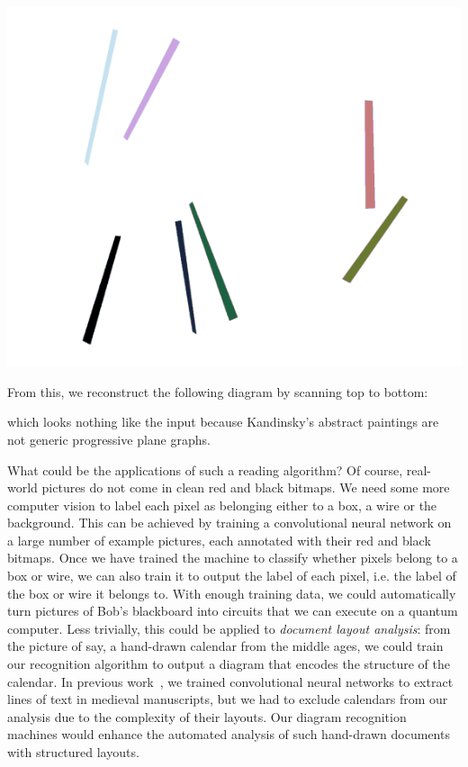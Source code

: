 \begin{example}
\begin{center}
\hspace{10pt}
\includegraphics[scale=.2]{img/punkt-und-linie/wires.png}
\end{center}

From this, we reconstruct the following diagram by scanning top to bottom:


which looks nothing like the input because Kandinsky's abstract paintings are not generic progressive plane graphs.
\end{example}

What could be the applications of such a reading algorithm?
Of course, real-world pictures do not come in clean red and black bitmaps.
We need some more computer vision to label each pixel as belonging either to a box, a wire or the background.
This can be achieved by training a convolutional neural network on a large number of example pictures, each annotated with their red and black bitmaps.
Once we have trained the machine to classify whether pixels belong to a box or wire, we can also train it to output the label of each pixel, i.e. the label of the box or wire it belongs to.
With enough training data, we could automatically turn pictures of Bob's blackboard into circuits that we can execute on a quantum computer.
Less trivially, this could be applied to \emph{document layout analysis}:
from the picture of say, a hand-drawn calendar from the middle ages, we could train our recognition algorithm to output a diagram that encodes the structure of the calendar.
In previous work~\cite{BorosEtAl19}, we trained convolutional neural networks to extract lines of text in medieval manuscripts, but we had to exclude calendars from our analysis due to the complexity of their layouts.
Our diagram recognition machines would enhance the automated analysis of such hand-drawn documents with structured layouts.

